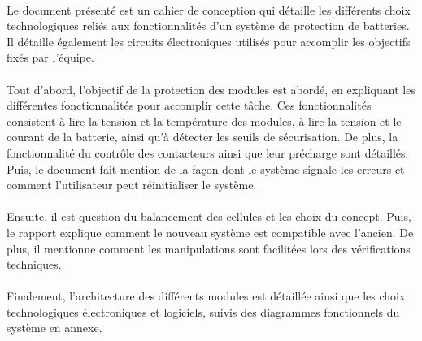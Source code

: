 		\paragraph*{}			
		Le document présenté est un cahier de conception qui détaille les différents choix technologiques reliés aux fonctionnalités d'un système de protection de batteries. Il détaille également les circuits électroniques utilisés pour accomplir les objectifs fixés par l'équipe. 

		\paragraph*{}		
		Tout d'abord, l'objectif de la protection des modules est abordé, en expliquant les différentes fonctionnalités pour accomplir cette tâche. Ces fonctionnalités consistent à lire la tension et la température des modules, à lire la tension et le courant de la batterie, ainsi qu'à détecter les seuils de sécurisation. De plus, la fonctionnalité du contrôle des contacteurs ainsi que leur précharge sont détaillés. Puis, le document fait mention de la façon dont le système signale les erreurs et comment l'utilisateur peut réinitialiser le système.
		
		\paragraph*{}
		Ensuite, il est question du balancement des cellules et les choix du concept. Puis, le rapport explique comment le nouveau système est compatible avec l'ancien. De plus, il mentionne comment les manipulations sont facilitées lors des vérifications techniques.
		
		\paragraph*{}
		Finalement, l'architecture des différents modules est détaillée ainsi que les choix technologiques électroniques et logiciels, suivis des diagrammes fonctionnels du système en annexe.
	
			
